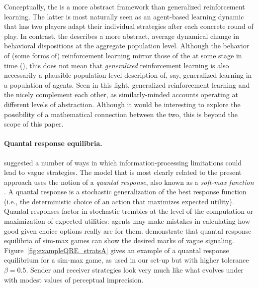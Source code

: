 \documentclass[fleqn,reqno,10pt]{article}
\newcommand{\rd}{\acro{rd}} %
\newcommand{\rdd}{\acro{rdd}} %
\newcommand{\toler}{\ensuremath{\beta}} %
\begin{document}
Conceptually, the \rdd is a more abstract framework than generalized reinforcement
learning. The latter is most naturally seen as an agent-based learning dynamic that has two
players adapt their individual strategies after each concrete round of play. In contrast, the
\rdd describes a more abstract, average dynamical change in behavioral dispositions at the
aggregate population level. Although the behavior of (some forms of) reinforcement learning
mirror those of the \rd at some stage in time
(\cite{BorgersSarin997:Learning-Throug,HopkinsPosch2005:Attainability-o,Beggs2005:On-the-Converge}),
this does not mean that \emph{generalized} reinforcement learning is also necessarily a
plausible population-level description of, say, generalized learning in a population of
agents. Seen in this light, generalized reinforcement learning and the \rdd nicely complement
each other, as similarly-minded accounts operating at different levels of abstraction.
Although it would be interesting to explore the possibility of a mathematical connection
between the two, this is beyond the scope of this paper.

\paragraph{Quantal response equilibria.}
\citet{FrankeJager2010:Vagueness-Signa} suggested a number of ways in which
information-processing limitations could lead to vague strategies. The model that is most
clearly related to the present approach uses the notion of a \emph{quantal response}, also
known as a \emph{soft-max function}
\citep[e.g.][]{Luce1959:Individual-Choi,McFadden1976:Quantal-Choice-,GoereeHolt2008:Quantal-Respons}. A
quantal response is a stochastic generalization of the best response function (i.e., the
deterministic choice of an action that maximizes expected utility). Quantal responses factor in
stochastic trembles at the level of the computation or maximization of expected utilities:
agents may make mistakes in calculating how good given choice options really are for
them. \citet{FrankeJager2010:Vagueness-Signa} demonstrate that quantal response equilibria of
sim-max games can show the desired marks of vague
signaling. Figure~\ref{fig:exampleQRE_stratsA} gives an example of a quantal response
equilibrium for a sim-max game, as used in our set-up but with higher tolerance $\toler =
0.5$.
Sender and receiver strategies look very much like what evolves under \rdd with modest values
of perceptual imprecision.
\end{document}
